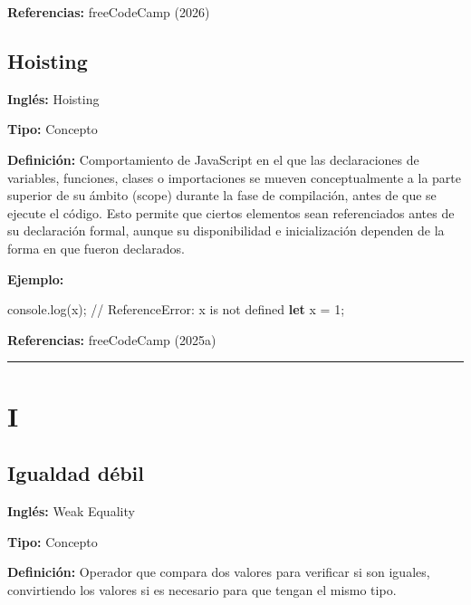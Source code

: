 \documentclass[
  letterpaper,
  DIV=11,
  numbers=noendperiod]{scrreprt}
\newenvironment{Shaded}{\begin{snugshade}}{\end{snugshade}}
\newcommand{\BuiltInTok}[1]{\textcolor[rgb]{0.00,0.23,0.31}{#1}}
\newcommand{\CommentTok}[1]{\textcolor[rgb]{0.37,0.37,0.37}{#1}}
\newcommand{\DecValTok}[1]{\textcolor[rgb]{0.68,0.00,0.00}{#1}}
\newcommand{\FunctionTok}[1]{\textcolor[rgb]{0.28,0.35,0.67}{#1}}
\newcommand{\KeywordTok}[1]{\textcolor[rgb]{0.00,0.23,0.31}{\textbf{#1}}}
\newcommand{\NormalTok}[1]{\textcolor[rgb]{0.00,0.23,0.31}{#1}}
\newcommand{\OperatorTok}[1]{\textcolor[rgb]{0.37,0.37,0.37}{#1}}
\let\oldsubsection\subsection
\renewcommand{\subsection}{\phantomsection\oldsubsection}
\begin{document}
\textbf{Referencias:} freeCodeCamp (2026)

\subsection*{Hoisting}\label{glos-hoisting}

\textbf{Inglés:} Hoisting

\textbf{Tipo:} Concepto

\textbf{Definición:} Comportamiento de JavaScript en el que las
declaraciones de variables, funciones, clases o importaciones se mueven
conceptualmente a la parte superior de su ámbito (scope) durante la fase
de compilación, antes de que se ejecute el código. Esto permite que
ciertos elementos sean referenciados antes de su declaración formal,
aunque su disponibilidad e inicialización dependen de la forma en que
fueron declarados.

\textbf{Ejemplo:}

\begin{Shaded}
\begin{Highlighting}[]
\BuiltInTok{console}\OperatorTok{.}\FunctionTok{log}\NormalTok{(x)}\OperatorTok{;} \CommentTok{// ReferenceError: x is not defined}
\KeywordTok{let}\NormalTok{ x }\OperatorTok{=} \DecValTok{1}\OperatorTok{;}
\end{Highlighting}
\end{Shaded}

\textbf{Referencias:} freeCodeCamp (2025a)

\begin{center}\rule{0.5\linewidth}{0.5pt}\end{center}

\section*{I}\label{i}


\subsection*{Igualdad débil}\label{glos-igualdad_duxe9bil}

\textbf{Inglés:} Weak Equality

\textbf{Tipo:} Concepto

\textbf{Definición:} Operador que compara dos valores para verificar si
son iguales, convirtiendo los valores si es necesario para que tengan el
mismo tipo.
\end{document}
